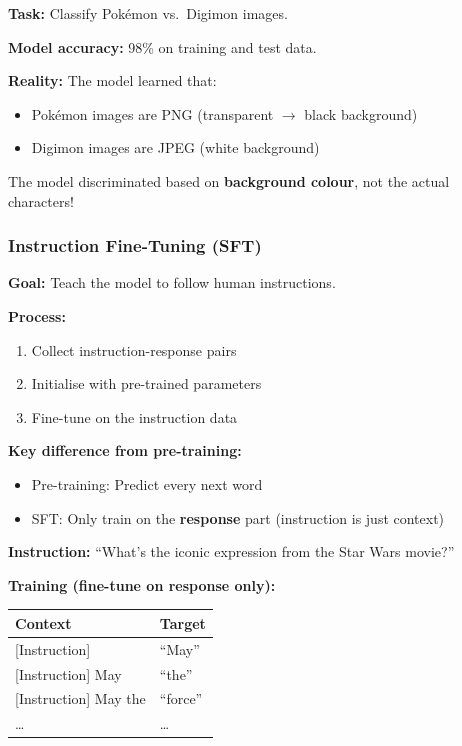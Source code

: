 \begin{exbox}
\textbf{Task:} Classify Pok\'{e}mon vs.\ Digimon images.

\textbf{Model accuracy:} 98\% on training and test data.

\textbf{Reality:} The model learned that:
\begin{itemize}
  \item Pok\'{e}mon images are PNG (transparent $\to$ black background)
  \item Digimon images are JPEG (white background)
\end{itemize}

The model discriminated based on \textbf{background colour}, not the actual characters!
\end{exbox}

\bigseparator

\subsubsection{Instruction Fine-Tuning (SFT)}

\begin{defbox}
\textbf{Goal:} Teach the model to follow human instructions.

\textbf{Process:}
\begin{enumerate}
  \item Collect instruction-response pairs
  \item Initialise with pre-trained parameters
  \item Fine-tune on the instruction data
\end{enumerate}

\textbf{Key difference from pre-training:}
\begin{itemize}
  \item Pre-training: Predict every next word
  \item SFT: Only train on the \textbf{response} part (instruction is just context)
\end{itemize}
\end{defbox}

\begin{exbox}
\textbf{Instruction:} ``What's the iconic expression from the Star Wars movie?''

\textbf{Training (fine-tune on response only):}
\begin{center}
\begin{tabular}{@{} l l @{}}
\toprule
\textbf{Context} & \textbf{Target} \\
\midrule
{[Instruction]} & ``May'' \\
{[Instruction]} May & ``the'' \\
{[Instruction]} May the & ``force'' \\
\ldots & \ldots \\
\bottomrule
\end{tabular}
\end{center}
\end{exbox}

